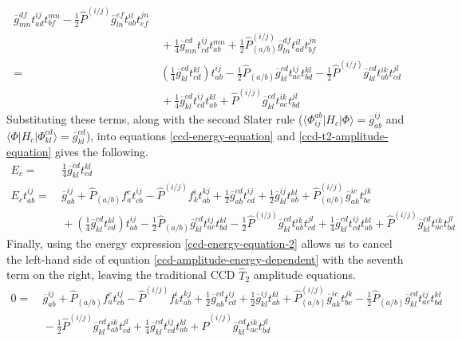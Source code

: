 \documentclass[11pt,fleqn]{article}
\newcommand{\F}{\Phi}        %
\newcommand{\ol}[1]{\ensuremath{\overline{#1}}}
\newcommand{\op}[1]{\ensuremath{\hat{#1}}}
\newcommand{\pr}[1]{\ensuremath{\left(#1\right)}}
\newcommand{\ip}[1]{\ensuremath{\langle#1\rangle}}
\theoremstyle{mystyle}
\begin{document}
\begin{align*}
  \ol{g}_{mn}^{df}
  t_{ad}^{ij}t_{bf}^{mn}
-
  \tfrac{1}{2}
  \op{P}^{(i/j)}
  \ol{g}_{ln}^{ef}
  t_{ab}^{il}t_{ef}^{jn}
\\&\
+
  \tfrac{1}{4}
  \ol{g}_{mn}^{cd}
  t_{cd}^{ij}t_{ab}^{mn}
+
  \tfrac{1}{2}
  \op{P}_{(a/b)}^{(i/j)}
  \ol{g}_{ln}^{df}
  t_{ad}^{il}t_{bf}^{jn}
\\=&\
  \pr{
    \tfrac{1}{4}
    \ol{g}_{kl}^{cd}
    t_{cd}^{kl}
  }
  t_{ab}^{ij}
-
  \tfrac{1}{2}
  \op{P}_{(a/b)}
  \ol{g}_{kl}^{cd}
  t_{ac}^{ij}t_{bd}^{kl}
-
  \tfrac{1}{2}
  \op{P}^{(i/j)}
  \ol{g}_{kl}^{cd}
  t_{ab}^{ik}t_{cd}^{jl}
\\&\
+
  \tfrac{1}{4}
  \ol{g}_{kl}^{cd}
  t_{cd}^{ij}t_{ab}^{kl}
+
  \op{P}^{(i/j)}
  \ol{g}_{kl}^{cd}
  t_{ac}^{ik}t_{bd}^{jl}
\end{align*}
Substituting these terms, along with the second Slater rule ($\ip{\F_{ij}^{ab}|H_c|\F}=\ol{g}_{ab}^{ij}$ and $\ip{\F|H_c|\F_{kl}^{cd}}=\ol{g}_{kl}^{cd}$), into equations \ref{ccd-energy-equation} and \ref{ccd-t2-amplitude-equation} gives the following.
\begin{align}
\label{ccd-energy-equation-2}
  E_c
=&\
  \tfrac{1}{4}
  \ol{g}_{kl}^{cd}t_{cd}^{kl}
\\
\label{ccd-amplitude-energy-dependent}
  E_ct_{ab}^{ij}
=&\
  \ol{g}_{ab}^{ij}
+
  \op{P}_{(a/b)}
  f_a^c
  t_{cb}^{ij}
-
  \op{P}^{(i/j)}
  f_k^i
  t_{ab}^{kj}
+
  \tfrac{1}{2}
  \ol{g}_{ab}^{cd}
  t_{cd}^{ij}
+
  \tfrac{1}{2}
  \ol{g}_{kl}^{ij}
  t_{ab}^{kl}
+
  \op{P}^{(i/j)}
        _{(a/b)}
  \ol{g}_{ak}^{ic}
  t_{bc}^{jk}
\nonumber
\\&\
+
  \pr{
    \tfrac{1}{4}
    \ol{g}_{kl}^{cd}
    t_{cd}^{kl}
  }
  t_{ab}^{ij}
-
  \tfrac{1}{2}
  \op{P}_{(a/b)}
  \ol{g}_{kl}^{cd}
  t_{ac}^{ij}t_{bd}^{kl}
-
  \tfrac{1}{2}
  \op{P}^{(i/j)}
  \ol{g}_{kl}^{cd}
  t_{ab}^{ik}t_{cd}^{jl}
+
  \tfrac{1}{4}
  \ol{g}_{kl}^{cd}
  t_{cd}^{ij}t_{ab}^{kl}
+
  \op{P}^{(i/j)}
  \ol{g}_{kl}^{cd}
  t_{ac}^{ik}t_{bd}^{jl}
\end{align}
Finally, using the energy expression \ref{ccd-energy-equation-2} allows us to cancel the left-hand side of equation \ref{ccd-amplitude-energy-dependent} with the seventh term on the right, leaving the traditional CCD $\op{T}_2$ amplitude equations.
\begin{align}
\nonumber
  0
=&\
  \ol{g}_{ab}^{ij}
+
  \op{P}_{(a/b)}
  f_a^c
  t_{cb}^{ij}
-
  \op{P}^{(i/j)}
  f_k^i
  t_{ab}^{kj}
+
  \tfrac{1}{2}
  \ol{g}_{ab}^{cd}
  t_{cd}^{ij}
+
  \tfrac{1}{2}
  \ol{g}_{kl}^{ij}
  t_{ab}^{kl}
+
  \op{P}^{(i/j)}
        _{(a/b)}
  \ol{g}_{ak}^{ic}
  t_{bc}^{jk}
-
  \tfrac{1}{2}
  \op{P}_{(a/b)}
  \ol{g}_{kl}^{cd}
  t_{ac}^{ij}t_{bd}^{kl}
\\&\
-
  \tfrac{1}{2}
  \op{P}^{(i/j)}
  \ol{g}_{kl}^{cd}
  t_{ab}^{ik}t_{cd}^{jl}
+
  \tfrac{1}{4}
  \ol{g}_{kl}^{cd}
  t_{cd}^{ij}t_{ab}^{kl}
+
  \op{P}^{(i/j)}
  \ol{g}_{kl}^{cd}
  t_{ac}^{ik}t_{bd}^{jl}
\end{align}
\end{document}
